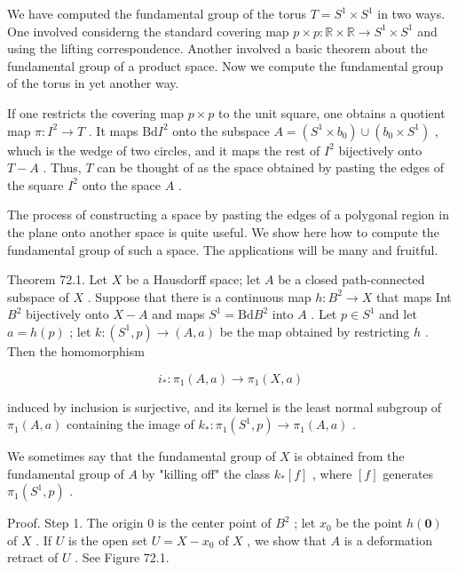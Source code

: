 We have computed the fundamental group of the torus \(T = {S}^{1} \times  {S}^{1}\) in two ways. One involved considerng the standard covering map \(p \times  p : \mathbb{R} \times  \mathbb{R} \rightarrow  {S}^{1} \times  {S}^{1}\) and using the lifting correspondence. Another involved a basic theorem about the fundamental group of a product space. Now we compute the fundamental group of the torus in yet another way.

If one restricts the covering map \(p \times  p\) to the unit square, one obtains a quotient map \(\pi  : {I}^{2} \rightarrow  T\) . It maps \(\mathrm{{Bd}}{I}^{2}\) onto the subspace \(A = \left( {{S}^{1} \times  {b}_{0}}\right)  \cup  \left( {{b}_{0} \times  {S}^{1}}\right)\) , whuch is the wedge of two circles, and it maps the rest of \({I}^{2}\) bijectively onto \(T - A\) . Thus, \(T\) can be thought of as the space obtained by pasting the edges of the square \({I}^{2}\) onto the space \(A\) .

The process of constructing a space by pasting the edges of a polygonal region in the plane onto another space is quite useful. We show here how to compute the fundamental group of such a space. The applications will be many and fruitful.

Theorem 72.1. Let \(X\) be a Hausdorff space; let \(A\) be a closed path-connected subspace of \(X\) . Suppose that there is a continuous map \(h : {B}^{2} \rightarrow  X\) that maps Int \({B}^{2}\) bijectively onto \(X - A\) and maps \({S}^{1} = \mathrm{{Bd}}{B}^{2}\) into \(A\) . Let \(p \in  {S}^{1}\) and let \(a = h\left( p\right)\) ; let \(k : \left( {{S}^{1},p}\right)  \rightarrow  \left( {A,a}\right)\) be the map obtained by restricting \(h\) . Then the homomorphism

\[
{i}_{ * } : {\pi }_{1}\left( {A,a}\right)  \rightarrow  {\pi }_{1}\left( {X,a}\right)
\]

induced by inclusion is surjective, and its kernel is the least normal subgroup of \({\pi }_{1}\left( {A,a}\right)\) containing the image of \({k}_{ * } : {\pi }_{1}\left( {{S}^{1},p}\right)  \rightarrow  {\pi }_{1}\left( {A,a}\right)\) .

We sometimes say that the fundamental group of \(X\) is obtained from the fundamental group of \(A\) by "killing off" the class \({k}_{ * }\left\lbrack  f\right\rbrack\) , where \(\left\lbrack  f\right\rbrack\) generates \({\pi }_{1}\left( {{S}^{1},p}\right)\) .

Proof. Step 1. The origin 0 is the center point of \({B}^{2}\) ; let \({x}_{0}\) be the point \(h\left( \mathbf{0}\right)\) of \(X\) . If \(U\) is the open set \(U = X - {x}_{0}\) of \(X\) , we show that \(A\) is a deformation retract of \(U\) . See Figure 72.1.

